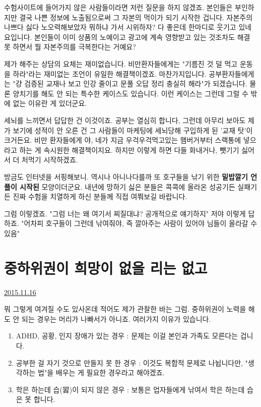 수험사이트에 들어가지 않은 사람들이라면 저런 질문을 하지 않겠죠.
본인들은 부인하지만 결국 나쁜 정보에 노출됨으로써 그 자본의 먹이가 되기 시작한 겁니다.
자본주의 나쁘다 싫다 노오력해보았자 뭐하냐 가서 시위하자? 다 좋은데 한마디로 웃기고 있네요입니다.
본인들이 이미 상품의 노예이고 광고에 계속 영향받고 있는 것조차도 해결 못 하면서 뭘 자본주의를 극복한다는 거예요?
\vspace{5mm}

제가 해주는 상담의 요체는 재미없습니다.
비만환자들에게는 "기름진 것 덜 먹고 운동을 하라"라는 재미없는 조언이 유일한 해결책이겠죠.
마찬가지입니다. 공부환자들에게는 "걍 검증된 교재나 보고 인강 줄이고 문풀 오답 정리 충실히 해라"가 되겠습니다.
물론 양치기를 해도 안 되는 특수한 케이스도 있습니다. 이런 케이스는 그런데 그럴 수 밖에 없는 이유란 게 있더군요.
\vspace{5mm}

세뇌를 느끼면서 답답한 건 이것이죠.
공부는 열심히 합니다, 그런데 아무리 보아도 제가 보기에 성적이 안 오른 건
그 사람들이 마케팅에 세뇌당해 구입하게 된 '교재 탓'이 크거든요.
비만 환자들에게 야, 네가 지금 우걱우걱먹고있는 햄버거부터 스랙통에 넣으라고 하는 게 속시원한 해결책이지요.
하지만 이렇게 하면 다들 화내거나, 뺏기기 싫어서 더 처먹기 시작하겠죠.
\vspace{5mm}

방금도 인터넷을 서핑해보니.
역시나 아니나다를까 또 호구들을 낚기 위한 \textbf{밑밥깔기 언플이 시작된} 모양이더군요.
내년에 망하기 싫은 분들은 콕콕에 올라온 성공기든 실패기든 진짜 수험을 치열하게 하신 분들께 직접 여쭤보길 바랍니다.
\vspace{5mm}

그럼 이렇겠죠. "그럼 너는 왜 여기서 찌질대냐? 공개적으로 얘기하지"
저야 이렇게 답하죠. "어차피 호구들이 그런데 낚여줘야, 즉 깔아주는 사람이 있어야 님들이 올라갈 수 있음"
\vspace{5mm}






\section{중하위권이 희망이 없을 리는 없고}
\href{https://www.kockoc.com/Apoc/492004}{2015.11.16}

\vspace{5mm}

뭐 그렇게 여겨질 수도 있사온데 적어도 제가 관찰한 바는 그럼.
중하위권이 노력을 해도 안 되는 경우는 머리가 나빠서가 아니죠. 여러가지 이유가 있습니다.
\vspace{5mm}
\begin{enumerate}
    \item ADHD, 공황, 인지 장애가 있는 경우 : 문제는 이걸 본인과 가족도 모른다는 겁니다.
    \item 공부한 걸 자기 것으로 만들지 못 한 경우 : 이것도 복합적 문제로 나뉩니다만, "생각하는 법"을 배우는 게 필요한 경우라고 해야겠죠.
    \item 학은 하는데 습(習)이 되지 않은 경우 : 보통은 업자들에게 낚여서 학은 하는데 습은 못 합니다.
\end{enumerate}
\vspace{5mm}

